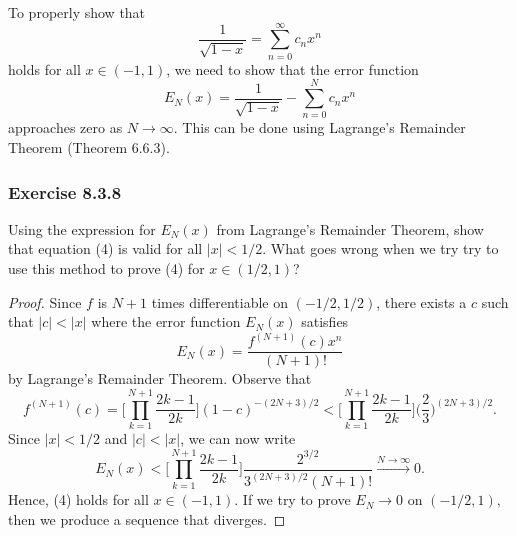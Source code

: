 To properly show that 
\[  \frac{ 1 }{ \sqrt{ 1-x  }  }  = \sum_{ n=0  }^{ \infty  } c_{n} x^{n}  \]
holds for all \( x \in (-1,1)  \), we need to show that the error function 
\[  E_{N}(x) = \frac{ 1 }{ \sqrt{ 1- x  }  }  - \sum_{ n=0  }^{ N  } c_{n } x^{ n} \]
approaches zero as \( N \to \infty  \). This can be done using Lagrange's Remainder Theorem (Theorem 6.6.3).


\subsubsection{Exercise 8.3.8} Using the expression for \( E_{N}(x)  \) from Lagrange's Remainder Theorem, show that equation (4) is valid for all \( | x  |  < 1 / 2  \). What goes wrong when we try try to use this method to prove (4) for \( x \in (1/2, 1 ) \)?
\begin{proof}
Since \( f  \) is \( N+1  \) times differentiable on \( (-1/2 , 1/ 2 ) \), there exists a \( c  \) such that \( |  c  |  < | x  |  \) where the error function \( E_{N}(x)  \) satisfies 
\[  E_{N}(x) = \frac{ f^{(N+1)}(c)  x^{n }  }{ (N+1)! } \] by Lagrange's Remainder Theorem. 
Observe that 
\[  f^{(N+1)}(c) = \Big[ \prod_{k=1}^{N+1} \frac{ 2k-1  }{ 2k }  \Big]   (1 -c )^{-(2N+3)/2} < \Big[ \prod_{k=1}^{N+1} \frac{ 2k-1  }{ 2k }  \Big]\Big( \frac{ 2 }{ 3 }  \Big)^{ (2N+3)/ 2}.\]
Since \( | x  |  < 1/ 2  \) and \( |  c  | < | x  |  \), we can now write
\[ E_{N}(x) < \Big[ \prod_{k=1}^{N+1} \frac{ 2k-1  }{ 2k }  \Big]\frac{  2^{3/2}}{  3^{(2N+3)/2} (N+1)! } \xrightarrow{N\rightarrow\infty} 0.   \]
Hence, (4) holds for all \( x \in (-1,1) \). If we try to prove \( E_{N} \to 0  \) on \( (-1/2 , 1 ) \), then we produce a sequence that diverges.
\end{proof}


